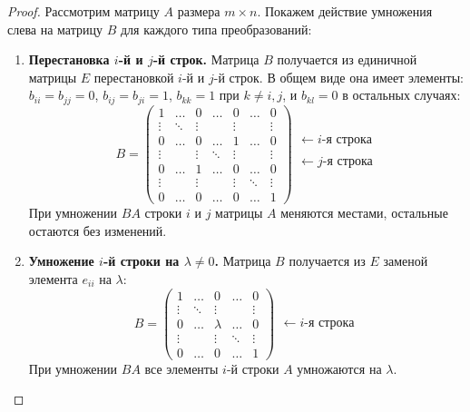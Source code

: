 \begin{proof}
Рассмотрим матрицу $A$ размера $m \times n$. Покажем действие умножения слева на матрицу $B$ для каждого типа преобразований:
\begin{enumerate}
    \item \textbf{Перестановка $i$-й и $j$-й строк.} 
    Матрица $B$ получается из единичной матрицы $E$ перестановкой $i$-й и $j$-й строк. В общем виде она имеет элементы: $b_{ii}=b_{jj}=0$, $b_{ij}=b_{ji}=1$, $b_{kk}=1$ при $k \neq i,j$, и $b_{kl}=0$ в остальных случаях:
    $$
    B = \begin{pmatrix}
    1 & \dots & 0 & \dots & 0 & \dots & 0 \\
    \vdots & \ddots & \vdots & & \vdots & & \vdots \\
    0 & \dots & 0 & \dots & 1 & \dots & 0 \\
    \vdots & & \vdots & \ddots & \vdots & & \vdots \\
    0 & \dots & 1 & \dots & 0 & \dots & 0 \\
    \vdots & & \vdots & & \vdots & \ddots & \vdots \\
    0 & \dots & 0 & \dots & 0 & \dots & 1
    \end{pmatrix}
    \begin{matrix}
    \\ \leftarrow i\text{-я строка} \\ \\ \leftarrow j\text{-я строка} \\ \\
    \end{matrix}
    $$
    При умножении $BA$ строки $i$ и $j$ матрицы $A$ меняются местами, остальные остаются без изменений.

    \item \textbf{Умножение $i$-й строки на $\lambda \neq 0$.} 
    Матрица $B$ получается из $E$ заменой элемента $e_{ii}$ на $\lambda$:
    $$
    B = \begin{pmatrix}
    1 & \dots & 0 & \dots & 0 \\
    \vdots & \ddots & \vdots & & \vdots \\
    0 & \dots & \lambda & \dots & 0 \\
    \vdots & & \vdots & \ddots & \vdots \\
    0 & \dots & 0 & \dots & 1
    \end{pmatrix}
    \begin{matrix}
    \\ \\ \leftarrow i\text{-я строка} \\ \\
    \end{matrix}
    $$
    При умножении $BA$ все элементы $i$-й строки $A$ умножаются на $\lambda$.


\end{enumerate}
\end{proof}

